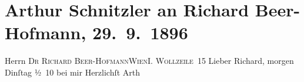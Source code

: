 

         
         \renewcommand{\erwaehntePersonen}{Personen: Richard Beer-Hofmann}
         \renewcommand{\erwaehnteOrte}{Orte: I., Innere Stadt, Wien, Wollzeile}
         \renewcommand{\erwaehnteWerke}{}
               \section[Arthur Schnitzler an Richard Beer-Hofmann, 29. 9. 1896]{ Arthur Schnitzler an Richard Beer-Hofmann, 29. 9. 1896}\nopagebreak{}\rehead{ }\begin{ledgroupsized}[t]{13cm}\normalsize\beginnumbering{} \toendnotes[C]{\smallbreak\pagebreak[2]} 
\pstart{}{\pb}Herrn \textsc{Dr Richard
                     Beer-Hofmann}\pend{}\pstart{}\textsc{Wien}\pend{}\pstart{}I. \textsc{Wollzeile 15}\pend{}{\bigskip}\pstart
           \noindent{}{\pb}Lieber Richard, morgen Dinſtag{ }½ 10 bei mir\pend
           \pstart Herzlichſt \spacefill\mbox{Arth}\pend{}
         
         \endnumbering{}\end{ledgroupsized}  \newcommand{\dateiname}{L00599}\newcommand{\titel}{Arthur Schnitzler an Richard Beer-Hofmann, 29. 9. 1896}\newcommand{\editorInnen}{Martin Anton Müller und Gerd-Hermann Susen}
      